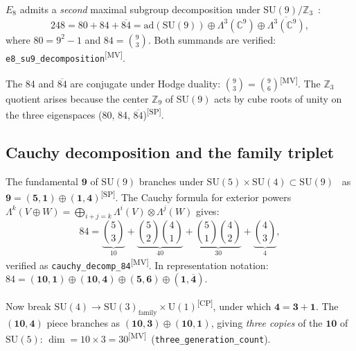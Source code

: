 \documentclass[aps,prl,twocolumn,showpacs,preprintnumbers,superscriptaddress,floatfix]{revtex4-2}
\newcommand{\ad}{\mathrm{ad}}
\newcommand{\MV}{\textsuperscript{[MV]}}
\newcommand{\CP}{\textsuperscript{[CP]}}
\newcommand{\SP}{\textsuperscript{[SP]}}
\begin{document}
$E_8$ admits a \emph{second} maximal subgroup decomposition under
$\mathrm{SU}(9)/\mathbb{Z}_3$~\cite{slansky1981,adams1996,ramond2010}:
\begin{equation}
  248 = 80 + 84 + \overline{84}
  = \ad(\mathrm{SU}(9)) \oplus \Lambda^3(\mathbb{C}^9) \oplus
  \overline{\Lambda^3(\mathbb{C}^9)},
  \label{eq:e8-su9}
\end{equation}
where $80 = 9^2 - 1$ and $84 = \binom{9}{3}$.  Both summands are
verified: \texttt{e8\_su9\_decomposition}\MV.

The 84 and $\overline{84}$ are conjugate under Hodge duality:
$\binom{9}{3} = \binom{9}{6}$\MV.  The $\mathbb{Z}_3$
quotient arises because the center $\mathbb{Z}_9$ of
$\mathrm{SU}(9)$ acts by cube roots of unity on the three
eigenspaces (80, 84, $\overline{84}$)\SP.

\subsection{Cauchy decomposition and the family triplet}

The fundamental $\mathbf{9}$ of $\mathrm{SU}(9)$ branches under
$\mathrm{SU}(5) \times \mathrm{SU}(4) \subset \mathrm{SU}(9)$~\cite{georgi1974,slansky1981} as
$\mathbf{9} = (\mathbf{5},\mathbf{1}) \oplus (\mathbf{1},\mathbf{4})$\SP.
The Cauchy formula for exterior powers
$\Lambda^k(V \oplus W) = \bigoplus_{i+j=k} \Lambda^i(V) \otimes
\Lambda^j(W)$ gives:
\begin{equation}
  84 = \underbrace{\binom{5}{3}}_{10} +
  \underbrace{\binom{5}{2}\binom{4}{1}}_{40} +
  \underbrace{\binom{5}{1}\binom{4}{2}}_{30} +
  \underbrace{\binom{4}{3}}_{4},
  \label{eq:cauchy}
\end{equation}
verified as \texttt{cauchy\_decomp\_84}\MV.  In representation
notation: $84 = (\mathbf{10},\mathbf{1}) \oplus
(\mathbf{10},\mathbf{4}) \oplus (\mathbf{5},\mathbf{6}) \oplus
(\mathbf{1},\overline{\mathbf{4}})$.

Now break $\mathrm{SU}(4) \to \mathrm{SU}(3)_\mathrm{family}
\times \mathrm{U}(1)$\CP, under which $\mathbf{4} = \mathbf{3}
+ \mathbf{1}$.  The $(\mathbf{10},\mathbf{4})$ piece branches as
$(\mathbf{10},\mathbf{3}) \oplus (\mathbf{10},\mathbf{1})$, giving
\emph{three copies} of the $\mathbf{10}$ of $\mathrm{SU}(5)$:
$\dim = 10 \times 3 = 30$\MV\ (\texttt{three\_generation\_count}).
\end{document}
